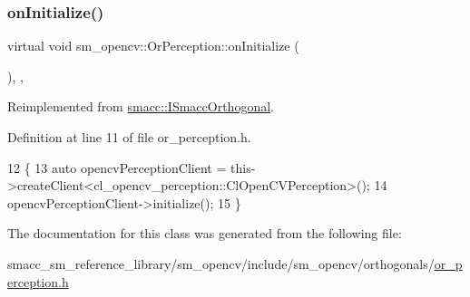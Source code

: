\subsubsection{\texorpdfstring{on\+Initialize()}{onInitialize()}}
{\footnotesize\ttfamily virtual void sm\+\_\+opencv\+::\+Or\+Perception\+::on\+Initialize (\begin{DoxyParamCaption}{ }\end{DoxyParamCaption})\hspace{0.3cm}{\ttfamily [inline]}, {\ttfamily [override]}, {\ttfamily [virtual]}}



Reimplemented from \hyperlink{classsmacc_1_1ISmaccOrthogonal_a6bb31c620cb64dd7b8417f8705c79c7a}{smacc\+::\+I\+Smacc\+Orthogonal}.



Definition at line 11 of file or\+\_\+perception.\+h.


\begin{DoxyCode}
12   \{
13     \textcolor{keyword}{auto} opencvPerceptionClient = this->createClient<cl\_opencv\_perception::ClOpenCVPerception>();
14     opencvPerceptionClient->initialize();
15   \}
\end{DoxyCode}


The documentation for this class was generated from the following file\+:\begin{DoxyCompactItemize}
\item 
smacc\+\_\+sm\+\_\+reference\+\_\+library/sm\+\_\+opencv/include/sm\+\_\+opencv/orthogonals/\hyperlink{sm__opencv_2include_2sm__opencv_2orthogonals_2or__perception_8h}{or\+\_\+perception.\+h}\end{DoxyCompactItemize}

